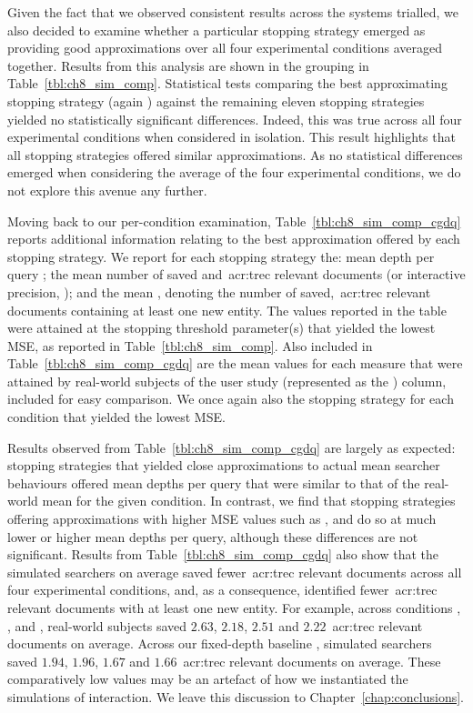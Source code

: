 Given the fact that we observed consistent results across the systems trialled, we also decided to examine whether a particular stopping strategy emerged as providing good approximations over all four experimental conditions averaged together. Results from this analysis are shown in the  grouping in Table~\ref{tbl:ch8_sim_comp}. Statistical tests comparing the best approximating stopping strategy (again ) against the remaining eleven stopping strategies yielded no statistically significant differences. Indeed, this was true across all four experimental conditions when considered in isolation. This result highlights that all stopping strategies offered similar approximations. As no statistical differences emerged when considering the average of the four experimental conditions, we do not explore this avenue any further.

Moving back to our per-condition examination, Table~\ref{tbl:ch8_sim_comp_cgdq} reports additional information relating to the best approximation offered by each stopping strategy. We report for each stopping strategy the: mean depth per query ; the mean number of saved and~\gls{acr:trec} relevant documents (or interactive precision, ); and the mean , denoting the number of saved,~\gls{acr:trec} relevant documents containing at least one new entity. The values reported in the table were attained at the stopping threshold parameter(s) that yielded the lowest MSE, as reported in Table~\ref{tbl:ch8_sim_comp}. Also included in Table~\ref{tbl:ch8_sim_comp_cgdq} are the mean values for each measure that were attained by real-world subjects of the user study (represented as the ) column, included for easy comparison. We once again also  the stopping strategy for each condition that yielded the lowest MSE.

Results observed from Table~\ref{tbl:ch8_sim_comp_cgdq} are largely as expected: stopping strategies that yielded close approximations to actual mean searcher behaviours offered mean depths per query that were similar to that of the real-world mean for the given condition. In contrast, we find that stopping strategies offering approximations with higher MSE values such as ,  and  do so at much lower or higher mean depths per query, although these differences are not significant. Results from Table~\ref{tbl:ch8_sim_comp_cgdq} also show that the simulated searchers on average saved fewer~\gls{acr:trec} relevant documents across all four experimental conditions, and, as a consequence, identified fewer~\gls{acr:trec} relevant documents with at least one new entity. For example, across conditions , ,  and , real-world subjects saved $2.63$, $2.18$, $2.51$ and $2.22$~\gls{acr:trec} relevant documents on average. Across our fixed-depth baseline , simulated searchers saved $1.94$, $1.96$, $1.67$ and $1.66$~\gls{acr:trec} relevant documents on average. These comparatively low values may be an artefact of how we instantiated the simulations of interaction. We leave this discussion to Chapter~\ref{chap:conclusions}.


